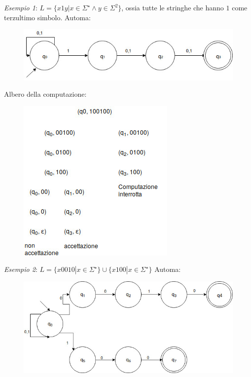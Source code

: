 \begin{description}
	\item \emph{Esempio 1}: $L =  \{x1y | x \in \Sigma^{\star} \land y \in \Sigma^2\}$, ossia tutte le stringhe che hanno $1$ come terzultimo simbolo.\newline
	Automa:
	\begin{figure}[H]
		\includegraphics[scale=0.7]{nfa1}
	\end{figure}
	Albero della computazione:
	\begin{figure}[H]
		\includegraphics[scale=0.7]{nfa1alb}
	\end{figure}
	\item \emph{Esempio 2}: $L = \{ x0010 | x \in \Sigma^{\star}\} \cup \{ x100 | x \in \Sigma^{\star}\}$
	Automa:
	\begin{figure}[H]
		\includegraphics[scale=0.7]{nfa2}
	\end{figure}
\end{description}
